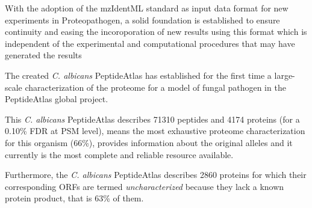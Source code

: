 With the adoption of the mzIdentML standard as input data format for new experiments
in Proteopathogen, a solid foundation is established to ensure continuity and easing
the incoroporation of new results using this format which is independent of the
experimental and computational procedures that may have generated the results

The created \textit{C. albicans} PeptideAtlas has established for the first time
a large-scale characterization of the proteome for a model of fungal pathogen
in the PeptideAtlas global project.


This \textit{C. albicans} PeptideAtlas describes 71310 peptides and 4174 proteins
(for a 0.10\% FDR at PSM level), means the most exhaustive proteome characterization
for this organism (66\%), provides information about the original alleles
and it currently is the most complete and reliable resource available.

Furthermore, the \textit{C. albicans} PeptideAtlas describes 2860 proteins
for which their corresponding ORFs are termed \textit{uncharacterized} because
they lack a known protein product, that is 63\% of them.

\endinput
